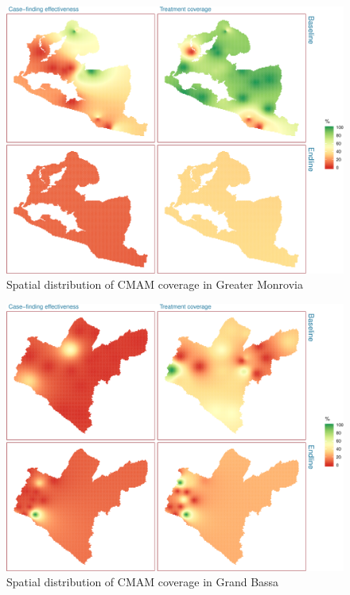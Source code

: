 \documentclass[12pt,a4paper]{article}
\begin{document}
\begin{figure}[H]

{\centering \includegraphics{liberiaCoverageFinalReport_files/figure-latex/cmamMap1-1} 

}

\caption{Spatial distribution of CMAM coverage in Greater Monrovia}\label{fig:cmamMap1}
\end{figure}

\begin{figure}[H]

{\centering \includegraphics{liberiaCoverageFinalReport_files/figure-latex/cmamMap2-1} 

}

\caption{Spatial distribution of CMAM coverage in Grand Bassa}\label{fig:cmamMap2}
\end{figure}
\end{document}

